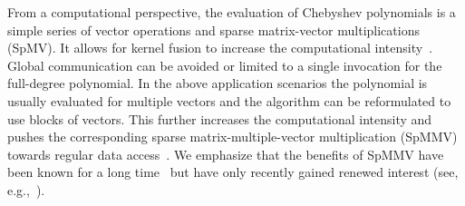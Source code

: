 \documentclass[letterpaper]{llncs}
\begin{document}
From a computational perspective, the evaluation of Chebyshev polynomials is a simple series of vector operations and sparse matrix-vector multiplications (SpMV). It allows for kernel fusion to increase the computational intensity~\cite{Kreutzer15KPM}. Global communication can be avoided or limited to a single invocation for the full-degree polynomial. In the above application scenarios the polynomial is usually evaluated for multiple vectors and the algorithm can be reformulated to use blocks of vectors. This further increases the computational intensity and pushes the corresponding sparse matrix-multiple-vector multiplication (SpMMV) towards regular data access~\cite{Kreutzer15KPM}. We emphasize that the benefits of SpMMV have been known for a long time~\cite{Gropp99} but have only recently  gained renewed interest (see, e.g.,~\cite{Liu12,Aktulga14,Anzt2015}).



\end{document}
